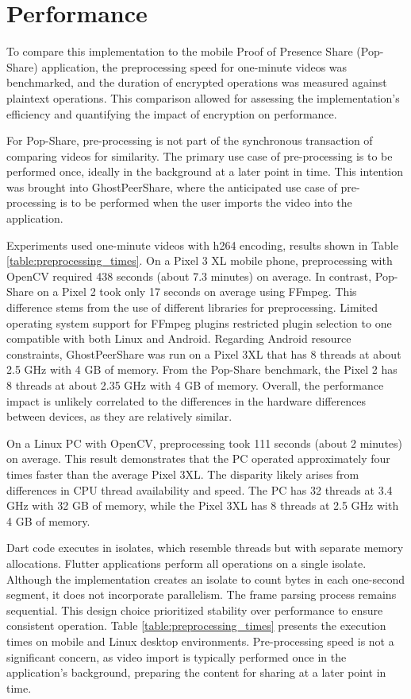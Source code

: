 \section{Performance}
\label{sec:Performance}
To compare this implementation to the mobile Proof of Presence Share (Pop-Share) application, the preprocessing speed for one-minute videos was benchmarked, and the duration of encrypted operations was measured against plaintext operations. This comparison allowed for assessing the implementation's efficiency and quantifying the impact of encryption on performance. 

For Pop-Share, pre-processing is not part of the synchronous transaction of comparing videos for similarity. The primary use case of pre-processing is to be performed once, ideally in the background at a later point in time. This intention was brought into GhostPeerShare, where the anticipated use case of pre-processing is to be performed when the user imports the video into the application.

Experiments used one-minute videos with h264 encoding, results shown in Table \ref{table:preprocessing_times}. On a Pixel 3 XL mobile phone, preprocessing with OpenCV required 438 seconds (about 7.3 minutes) on average. In contrast, Pop-Share on a Pixel 2 took only 17 seconds on average using FFmpeg. This difference stems from the use of different libraries for preprocessing. Limited operating system support for FFmpeg plugins restricted plugin selection to one compatible with both Linux and Android. Regarding Android resource constraints, GhostPeerShare was run on a Pixel 3XL that has 8 threads at about 2.5 GHz with 4 GB of memory. From the Pop-Share benchmark, the Pixel 2 has 8 threads at about 2.35 GHz with 4 GB of memory. Overall, the performance impact is unlikely correlated to the differences in the hardware differences between devices, as they are relatively similar.

On a Linux PC with OpenCV, preprocessing took 111 seconds (about 2 minutes) on average. This result demonstrates that the PC operated approximately four times faster than the average Pixel 3XL. The disparity likely arises from differences in CPU thread availability and speed. The PC has 32 threads at 3.4 GHz with 32 GB of memory, while the Pixel 3XL has 8 threads at 2.5 GHz with 4 GB of memory.



Dart code executes in isolates, which resemble threads but with separate memory allocations. Flutter applications perform all operations on a single isolate. Although the implementation creates an isolate to count bytes in each one-second segment, it does not incorporate parallelism. The frame parsing process remains sequential. This design choice prioritized stability over performance to ensure consistent operation. Table \ref{table:preprocessing_times} presents the execution times on mobile and Linux desktop environments. Pre-processing speed is not a significant concern, as video import is typically performed once in the application's background, preparing the content for sharing at a later point in time.

